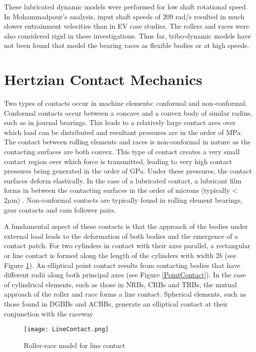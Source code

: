 These lubricated dynamic models were performed for low shaft rotational speed. In Mohammadpour’s analysis, input shaft speeds of 209 rad/s resulted in much slower entrainment velocities than in EV case studies. The rollers and races were also considered rigid in these investigations. Thus far, tribo-dynamic models have not been found that model the bearing races as flexible bodies or at high speeds.

\section{Hertzian Contact Mechanics}

Two types of contacts occur in machine elements: conformal and non-conformal. Conformal contacts occur between a concave and a convex body of similar radius, such as in journal bearings. This leads to a relatively large contact area over which load can be distributed and resultant pressures are in the order of MPa. The contact between rolling elements and races is non-conformal in nature as the contacting surfaces are both convex. This type of contact creates a very small contact region over which force is transmitted, leading to very high contact pressures being generated in the order of GPa. Under these pressures, the contact surfaces deform elastically. In the case of a lubricated contact, a lubricant film forms in between the contacting surfaces in the order of microns (typically < $2 \mu \mathrm{m}$) \cite{Gohar2018}. Non-conformal contacts are typically found in rolling element bearings, gear contacts and cam follower pairs.

A fundamental aspect of these contacts is that the approach of the bodies under external load leads to the deformation of both bodies and the emergence of a contact patch. For two cylinders in contact with their axes parallel, a rectangular or line contact is formed along the length of the cylinders with width $2b$ (see Figure \ref{LineContact}). An elliptical point contact results from contacting bodies that have different radii along both principal axes \cite{Johnson1985} (see Figure \ref{PointContact}). In the case of cylindrical elements, such as those in NRBs, CRBs and TRBs, the mutual approach of the roller and race forms a line contact. Spherical elements, such as those found in DGBBs and ACBBs, generate an elliptical contact at their conjunction with the raceway

\begin{figure}
	\centerline{\texttt{[image: LineContact.png]}}
	\caption{Roller-race model for line contact \cite{Zaretsky2016}}
	\label{LineContact}
\end{figure}

